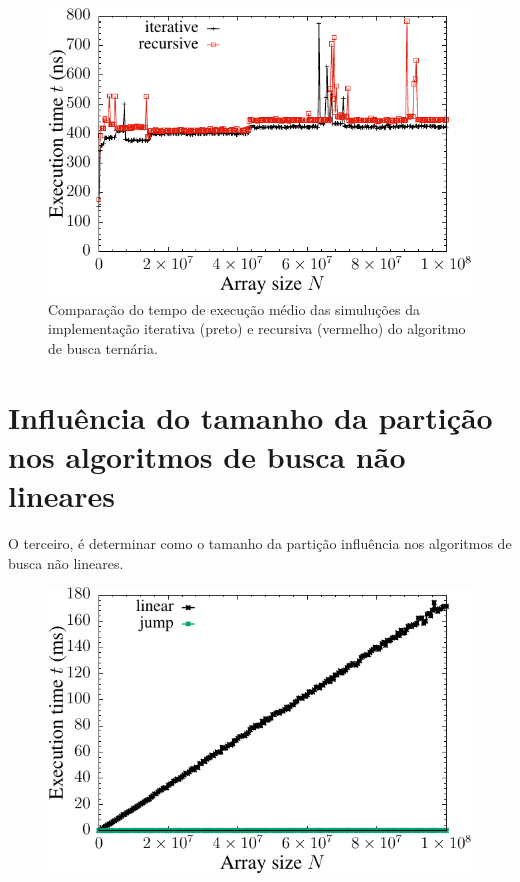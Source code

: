 \begin{figure}[H]
  \centering
  \includegraphics[scale=1.2]{../plots/tsearch_itvsrec_time.pdf}
  \caption{Comparação do tempo de execução médio das simuluções da implementação iterativa (preto) e recursiva (vermelho) do algoritmo de busca ternária.}
\end{figure} \label{fig:tsearch_ivsr_time}


\section{Influência do tamanho da partição nos algoritmos de busca não lineares}

O terceiro, é determinar como o tamanho da partição influência nos algoritmos de busca não lineares.

\begin{figure}[H]
  \centering
  \includegraphics[scale=1.2]{../plots/lvsj_search_time.pdf}
\end{figure} \label{fig:lvsj_search_time}


